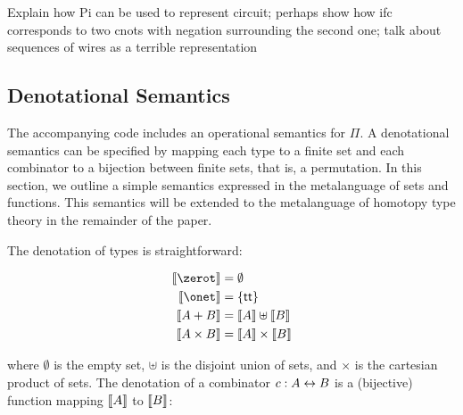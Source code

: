 Explain how Pi can be used to represent circuit; perhaps show how ifc corresponds to two cnots with negation surrounding
the second one; talk about sequences of wires as a terrible representation



\subsection{Denotational Semantics}

\noindent The accompanying code includes an operational semantics for $\Pi$. A denotational semantics can be
specified by mapping each type to a finite set and each combinator to a bijection between finite sets, that is, a
permutation. In this section, we outline a simple semantics expressed in the metalanguage of sets and functions. This
semantics will be extended to the metalanguage of homotopy type theory in the remainder of the paper.

The denotation of types is straightforward:

\begin{align*}
  \denot{\zerot}     & = \emptyset                  \\
  \denot{\onet}      & = \{ \Acon{tt} \}            \\
  \denot{A + B}      & = \denot{A} \uplus \denot{B} \\
  \denot{A \times B} & = \denot{A} \times \denot{B}
\end{align*}

where $\emptyset$ is the empty set, $\uplus$ is the disjoint union of sets, and $\times$ is the cartesian product of
sets. The denotation of a combinator $c : A \leftrightarrow B$ is a (bijective) function mapping $\llbracket A\rrbracket$ to $\llbracket B\rrbracket$:

